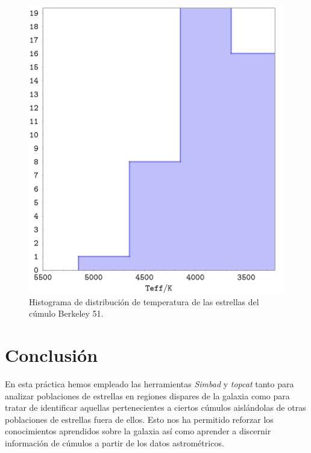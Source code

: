 \documentclass[a4paper,fleqn,usenatbib]{mnras}
\begin{document}
\begin{figure}
  \includegraphics[width=\linewidth]{img/b51_teff}
  \caption{Histograma de distribución de temperatura de las estrellas del cúmulo Berkeley 51.}
  \label{fig:e2_b51_teff}
\end{figure}

\section{Conclusión}

En esta práctica hemos empleado las herramientas \emph{Simbad} y \emph{topcat} tanto para analizar poblaciones de estrellas en regiones dispares de la galaxia como para tratar de identificar aquellas pertenecientes a ciertos cúmulos aislándolas de otras poblaciones de estrellas fuera de ellos. Esto nos ha permitido reforzar los conocimientos aprendidos sobre la galaxia así como aprender a discernir información de cúmulos a partir de los datos astrométricos.













\bsp	%
\label{lastpage}
\end{document}
